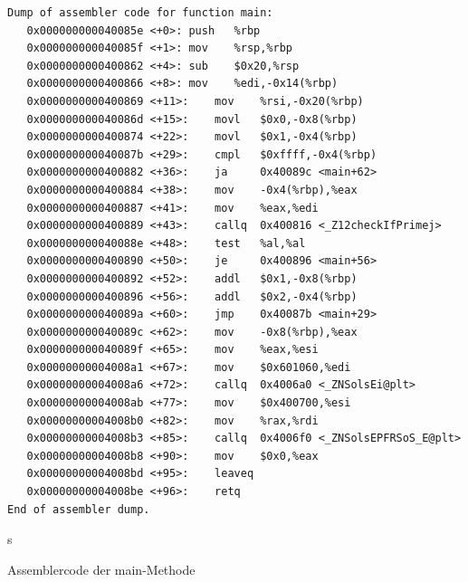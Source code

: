 \documentclass[12pt]{article}
\begin{document}
\begin{code}
\begin{lstlisting}
Dump of assembler code for function main:
   0x000000000040085e <+0>:	push   %rbp
   0x000000000040085f <+1>:	mov    %rsp,%rbp
   0x0000000000400862 <+4>:	sub    $0x20,%rsp
   0x0000000000400866 <+8>:	mov    %edi,-0x14(%rbp)
   0x0000000000400869 <+11>:	mov    %rsi,-0x20(%rbp)
   0x000000000040086d <+15>:	movl   $0x0,-0x8(%rbp)
   0x0000000000400874 <+22>:	movl   $0x1,-0x4(%rbp)
   0x000000000040087b <+29>:	cmpl   $0xffff,-0x4(%rbp)
   0x0000000000400882 <+36>:	ja     0x40089c <main+62>
   0x0000000000400884 <+38>:	mov    -0x4(%rbp),%eax
   0x0000000000400887 <+41>:	mov    %eax,%edi
   0x0000000000400889 <+43>:	callq  0x400816 <_Z12checkIfPrimej>
   0x000000000040088e <+48>:	test   %al,%al
   0x0000000000400890 <+50>:	je     0x400896 <main+56>
   0x0000000000400892 <+52>:	addl   $0x1,-0x8(%rbp)
   0x0000000000400896 <+56>:	addl   $0x2,-0x4(%rbp)
   0x000000000040089a <+60>:	jmp    0x40087b <main+29>
   0x000000000040089c <+62>:	mov    -0x8(%rbp),%eax
   0x000000000040089f <+65>:	mov    %eax,%esi
   0x00000000004008a1 <+67>:	mov    $0x601060,%edi
   0x00000000004008a6 <+72>:	callq  0x4006a0 <_ZNSolsEi@plt>
   0x00000000004008ab <+77>:	mov    $0x400700,%esi
   0x00000000004008b0 <+82>:	mov    %rax,%rdi
   0x00000000004008b3 <+85>:	callq  0x4006f0 <_ZNSolsEPFRSoS_E@plt>
   0x00000000004008b8 <+90>:	mov    $0x0,%eax
   0x00000000004008bd <+95>:	leaveq 
   0x00000000004008be <+96>:	retq   
End of assembler dump.
\end{lstlisting}s
\caption[Assemblercode der main Methode]{Assemblercode der main-Methode}
\end{code}
\end{document}
